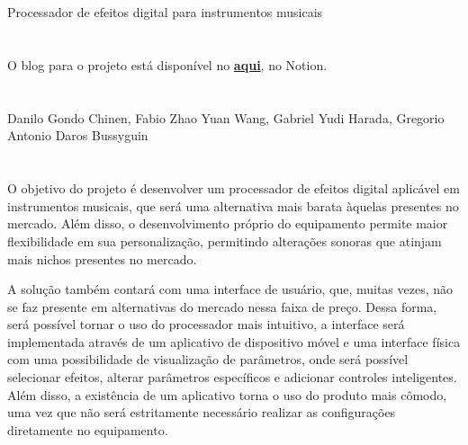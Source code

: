 \section{}
Processador de efeitos digital para instrumentos musicais
\section{}
O blog para o projeto está disponível no \href{https://www.notion.so/Introdu-o-2574e26b01868046a879e09b697b6f35?source=copy_link}{\textbf{aqui}}, no Notion.
\section{}
Danilo Gondo Chinen,
Fabio Zhao Yuan Wang,
Gabriel Yudi Harada,
Gregorio Antonio Daros Bussyguin
\section{}
O objetivo do projeto é desenvolver um processador de efeitos digital aplicável em instrumentos musicais, que será uma alternativa mais barata àquelas presentes no mercado. Além disso, o desenvolvimento próprio do equipamento permite maior flexibilidade em sua personalização, permitindo alterações sonoras que atinjam mais nichos presentes no mercado.

A solução também contará com uma interface de usuário, que, muitas vezes, não se faz presente em alternativas do mercado nessa faixa de preço. Dessa forma, será possível tornar o uso do processador mais intuitivo, a interface será implementada através de um aplicativo de dispositivo móvel e uma interface física com uma possibilidade de visualização de parâmetros, onde será possível selecionar efeitos, alterar parâmetros específicos e adicionar controles inteligentes. Além disso, a existência de um aplicativo torna o uso do produto mais cômodo, uma vez que não será estritamente necessário realizar as configurações diretamente no equipamento.

\\

\section{}

\subsection{}

